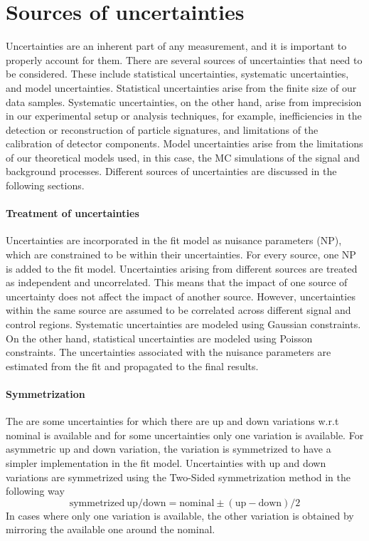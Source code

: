 \section{Sources of uncertainties}
\label{sec:sources-of-uncertainties}
Uncertainties are an inherent part of any measurement, and it is important to properly account for them. There are several sources of uncertainties that need to be considered. These include statistical uncertainties, systematic uncertainties, and model uncertainties. Statistical uncertainties arise from the finite size of our data samples. Systematic uncertainties, on the other hand, arise from imprecision in our experimental setup or analysis techniques, for example, inefficiencies in the detection or reconstruction of particle signatures, and limitations of the calibration of detector components. Model uncertainties arise from the limitations of our theoretical models used, in this case, the MC simulations of the signal and background processes. Different sources of uncertainties are discussed in the following sections. 

\paragraph{Treatment of uncertainties}Uncertainties are incorporated in the fit model as nuisance parameters (NP), which are constrained to be within their uncertainties. For every source, one NP is added to the fit model. Uncertainties arising from different sources are treated as independent and uncorrelated. This means that the impact of one source of uncertainty does not affect the impact of another source. However, uncertainties within the same source are assumed to be correlated across different signal and control regions. Systematic uncertainties are modeled using Gaussian constraints. On the other hand, statistical uncertainties are modeled using Poisson constraints. The uncertainties associated with the nuisance parameters are estimated from the fit and propagated to the final results.

\paragraph{Symmetrization}The are some uncertainties for which there are up and down variations w.r.t nominal is available and for some uncertainties only one variation is available. For asymmetric up and down variation, the variation is symmetrized to have a simpler implementation in the fit model. Uncertainties with up and down variations are symmetrized using the Two-Sided symmetrization method in the following way $$ \mathrm{symmetrized \ up/down} = \mathrm{nominal} \pm (\mathrm{up - down})/2 $$ In cases where only one variation is available, the other variation is obtained by mirroring the available one around the nominal. 

